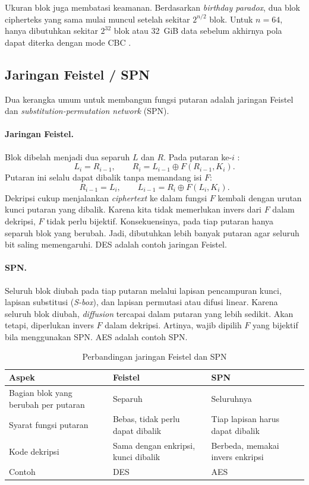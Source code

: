 Ukuran blok juga membatasi keamanan. Berdasarkan \textit{birthday paradox}, dua blok cipherteks
yang sama mulai muncul setelah sekitar $2^{n/2}$ blok. Untuk $n = 64$, hanya dibutuhkan sekitar $2^{32}$
blok atau 32~GiB data sebelum akhirnya pola dapat diterka dengan mode CBC \cite{sweet32}.

\subsection{Jaringan Feistel / SPN}
Dua kerangka umum untuk membangun fungsi putaran adalah jaringan Feistel dan \textit{substitution-permutation network} (SPN).

\paragraph{Jaringan Feistel.} Blok dibelah menjadi dua separuh $L$ dan $R$. Pada putaran ke-$i$ \cite{feistel}:
\begin{equation}
  L_i = R_{i-1}, \qquad R_i = L_{i-1} \oplus F(R_{i-1}, K_i).
\end{equation}
Putaran ini selalu dapat dibalik tanpa memandang isi $F$:
\begin{equation}
  R_{i-1} = L_i, \qquad L_{i-1} = R_i \oplus F(L_i, K_i).
\end{equation}
Dekripsi cukup menjalankan \textit{ciphertext} ke dalam fungsi $F$ kembali dengan urutan kunci putaran yang dibalik.
Karena kita tidak memerlukan invers dari $F$ dalam dekripsi, $F$ tidak perlu bijektif.
Konsekuensinya, pada tiap putaran hanya separuh blok yang berubah. Jadi, dibutuhkan lebih banyak putaran agar seluruh bit saling
memengaruhi. DES \cite{des} adalah contoh jaringan Feistel.

\paragraph{SPN.} Seluruh blok diubah pada tiap putaran melalui lapisan pencampuran kunci,
lapisan substitusi (\textit{S-box}), dan lapisan permutasi atau difusi linear. Karena seluruh
blok diubah, \textit{diffusion} tercapai dalam putaran yang lebih sedikit. Akan tetapi, diperlukan invers $F$ dalam
dekripsi. Artinya, wajib dipilih $F$ yang bijektif
bila menggunakan SPN. AES \cite{aes} adalah contoh SPN.

\begin{table}[H]
  \centering
  \caption{Perbandingan jaringan Feistel dan SPN}
  \begin{tabular}{p{4cm}p{5.2cm}p{5.2cm}}
    \toprule
    Aspek & Feistel & SPN \\
    \midrule
    Bagian blok yang berubah per putaran & Separuh & Seluruhnya \\
    Syarat fungsi putaran & Bebas, tidak perlu dapat dibalik & Tiap lapisan harus dapat dibalik \\
    Kode dekripsi & Sama dengan enkripsi, kunci dibalik & Berbeda, memakai invers enkripsi\\
    Contoh & DES & AES \\
    \bottomrule
  \end{tabular}
\end{table}

